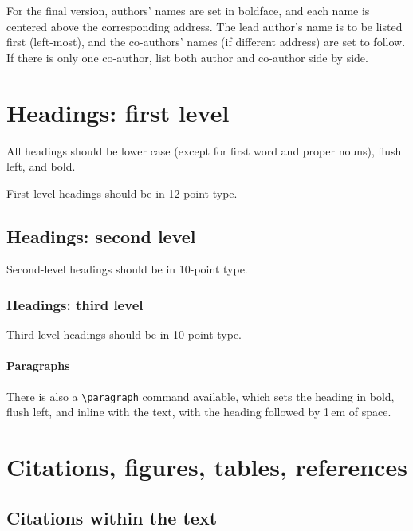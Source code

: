 \documentclass{article}
\begin{document}
For the final version, authors' names are set in boldface, and each name is
centered above the corresponding address. The lead author's name is to be listed
first (left-most), and the co-authors' names (if different address) are set to
follow. If there is only one co-author, list both author and co-author side by
side.


\section{Headings: first level}
\label{headings}


All headings should be lower case (except for first word and proper nouns),
flush left, and bold.


First-level headings should be in 12-point type.


\subsection{Headings: second level}


Second-level headings should be in 10-point type.


\subsubsection{Headings: third level}


Third-level headings should be in 10-point type.


\paragraph{Paragraphs}


There is also a \verb+\paragraph+ command available, which sets the heading in
bold, flush left, and inline with the text, with the heading followed by 1\,em
of space.


\section{Citations, figures, tables, references}
\label{others}


\subsection{Citations within the text}
\end{document}
